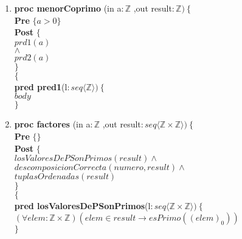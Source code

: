\documentclass[a4paper]{article}
\begin{document}
\begin{enumerate}[label=\alph*)]
		\item
		
			\textbf{proc menorCoprimo }(in a$:\mathbb{Z}$
				,out result$:\mathbb{Z} )\ \{$\smallskip \\
			\hspace*{6mm} \textbf{Pre }$\{a>0 \}$\smallskip \\
			\hspace*{6mm} \textbf{Post }$\{$\\
			\hspace*{6mm} $prd1(a)$\\
			\hspace*{6mm} $\wedge$\\
			\hspace*{6mm} $prd2(a)$\\
			\hspace*{6mm} $\}$\\
			$\{$\smallskip \\
			
			\textbf{pred pred1}(l$: seq\langle \mathbb{Z}\rangle)\ \{$\smallskip \\
			\hspace*{6mm}$body$\\
			$\}$	
			
		\item 
			
			\textbf{proc factores }(in a$:\mathbb{Z}$
				,out result$:seq\langle \mathbb{Z} \times \mathbb{Z}\rangle )\ \{$\smallskip \\
			\hspace*{6mm} \textbf{Pre }$\{ \}$\smallskip \\
			\hspace*{6mm} \textbf{Post }$\{$\\
			\hspace*{6mm} $losValoresDePSonPrimos(result)\wedge$\\
			\hspace*{6mm} $descomposicionCorrecta(numero,result)\wedge$\\
			\hspace*{6mm} $tuplasOrdenadas(result)$\\
			\hspace*{6mm} $\}$\\
			$\{$\smallskip \\
			
			\textbf{pred losValoresDePSonPrimos}(l$:seq\langle \mathbb{Z} \times \mathbb{Z}
			\rangle)\ \{$\smallskip \\
			\hspace*{6mm}$(\forall elem:\mathbb{Z}\times \mathbb{Z})
				(elem\in result\rightarrow esPrimo((elem)_0))$\\
			$\}$\smallskip \\
			

\end{enumerate}
\end{document}
